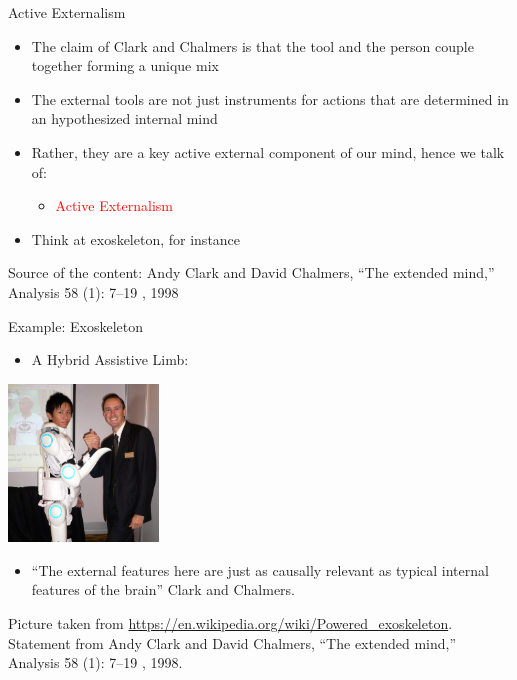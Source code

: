 \documentclass{beamer}
\begin{document}
\begin{frame}
{\centerline{Active Externalism}}
\begin{itemize}
    \item The claim of Clark and Chalmers is that the tool and the person couple together forming a unique mix
    \item The external tools are not just instruments for actions that are determined in an hypothesized internal mind
    \item Rather, they are a key active external component of our mind, hence we talk of:
    \begin{itemize}
    \item \textcolor{red}{Active Externalism}
\end{itemize} 
     \item Think at exoskeleton, for instance 
\end{itemize} 

\begin{center}
    \tiny{Source of the content: Andy Clark and David Chalmers, ``The extended mind,'' Analysis 58 (1): 7--19 , 1998}
\end{center}

\end{frame}

\begin{frame}
{\centerline{Example: Exoskeleton}}

\begin{itemize}
    \item A Hybrid Assistive Limb:
\end{itemize} 

\begin{center}
 \includegraphics[width=4cm]{P2023.AIBCCSS.ExtendedMindDistributedCognitionSystemicThinking/Hybrid_Assistive_Limb.jpg}
 
 \end{center}
 
 \begin{itemize}
 \item ``The external features here are just as causally relevant as typical internal features of the brain'' Clark and Chalmers.
 \end{itemize}
 
\begin{center}
    \tiny{Picture taken from \url{https://en.wikipedia.org/wiki/Powered_exoskeleton}. Statement from Andy Clark and David Chalmers, ``The extended mind,'' Analysis 58 (1): 7--19 , 1998.}
\end{center}
\end{frame}
\end{document}
